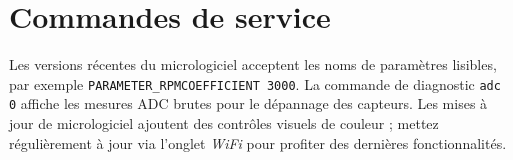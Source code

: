 \section{Commandes de service}
Les versions récentes du micrologiciel acceptent les noms de paramètres lisibles, par exemple \verb|PARAMETER_RPMCOEFFICIENT 3000|.
La commande de diagnostic \verb|adc 0| affiche les mesures ADC brutes pour le dépannage des capteurs.
Les mises à jour de micrologiciel ajoutent des contrôles visuels de couleur ; mettez régulièrement à jour via l'onglet \emph{WiFi} pour profiter des dernières fonctionnalités.
